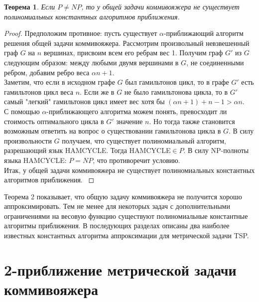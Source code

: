 \documentclass[a4paper]{article}
\newtheorem{theorem}{Теорема}
\begin{document}
\begin{theorem}
    Если $P\ne NP$, то у общей задачи коммивояжера не существует полиномиальных константных алгоритмов приближения.
\end{theorem}
\begin{proof}
    Предположим противное: пусть существует $\alpha$-приближающий алгоритм решения общей задачи коммивояжера. Рассмотрим произвольный невзвешенный граф $G$ на $n$ вершинах, присвоим всем его ребрам вес 1. Получим граф $G'$ из $G$ следующим образом: между любыми двумя вершинами в $G$, не соединенными ребром, добавим ребро веса $\alpha n+1$.\\ Заметим, что если в исходном графе $G$ был гамильтонов цикл, то в графе $G'$ есть гамильтонов цикл веса $n$. Если же в $G$ не было гамильтонова цикла, то в $G'$ самый "легкий" гамильтонов цикл имеет вес хотя бы $(\alpha n + 1) + n-1 > \alpha n$.\\
    С помощью $\alpha$-приближающего алгоритма можем понять, превосходит ли стоимость оптимального цикла в $G'$ значение $n$. Но тогда также становится возможным ответить на вопрос о существовании гамильтонова цикла в $G$. В силу произвольности $G$ получаем, что существует полиномиальный алгоритм, разрешающий язык HAMCYCLE. Тогда HAMCYCLE$\in P$. В силу NP-полноты языка HAMCYCLE: $P=NP$, что противоречит условию.\\
    Итак, у общей задачи коммивояжера не существует полиномиальных константных алгоритмов приближения. \cite{kormen}
\end{proof}
Теорема 2 показывает, что общую задачу коммивояжера не получится хорошо аппроксимировать. Тем не менее для некоторых задач с дополнительными ограничениями на весовую функцию существуют полиномиальные константные алгоритмы приближения. В последующих разделах описаны два наиболее известных константных алгоритма аппроксимации для метрической задачи TSP.

\bigskip

\section{2-приближение метрической задачи коммивояжера}
\end{document}
